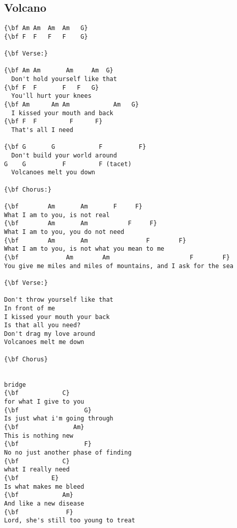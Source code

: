 \documentclass[a4paper]{article}
\begin{document}
\subsection{Volcano} %
\label{sub:Volcano}
\begin{Verbatim}[commandchars=\\\{\}]
{\bf Am	Am	Am	Am   G}
{\bf F	F	F	F    G}

{\bf Verse:}

{\bf Am	Am	     Am	  	Am  G}
  Don't hold yourself like that
{\bf F	F		F	F   G}
  You'll hurt your knees
{\bf Am      Am	Am            Am   G}
  I kissed your mouth and back
{\bf F	F         F      F}
  That's all I need

{\bf G       G            F          F}
  Don't build your world around
G    G          F         F (tacet)
  Volcanoes melt you down

{\bf Chorus:}

{\bf        Am       Am       F     F}
What I am to you, is not real
{\bf        Am       Am           F     F}
What I am to you, you do not need
{\bf        Am       Am                F        F}
What I am to you, is not what you mean to me
{\bf             Am        Am                      F        F}
You give me miles and miles of mountains, and I ask for the sea

{\bf Verse:}

Don't throw yourself like that
In front of me
I kissed your mouth your back
Is that all you need?
Don't drag my love around
Volcanoes melt me down

{\bf Chorus}


bridge
{\bf            C}
for what I give to you
{\bf                  G}
Is just what i'm going through
{\bf               Am}
This is nothing new
{\bf                  F}
No no just another phase of finding
{\bf            C}
what I really need
{\bf         E}
Is what makes me bleed
{\bf            Am}
And like a new disease
{\bf             F}
Lord, she's still too young to treat
\end{Verbatim}
\newpage
\end{document}
